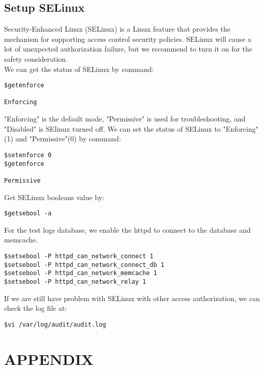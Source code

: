 \subsection{Setup SELinux}
Security-Enhanced Linux (SELinux) is a Linux feature that provides the mechanism for supporting access control security policies.
SELinux will cause a lot of unexpected authorization failure, but we recommend to turn it on for the safety consideration.\\ 
We can get the status of SELinux by command:
\begin{lstlisting}
$getenforce

Enforcing
\end{lstlisting}
"Enforcing" is the default mode, "Permissive" is used for troubleshooting, and "Disabled" is SElinux turned off.
We can set the status of SELinux to "Enforcing"(1) and "Permissive"(0) by command:
\begin{lstlisting}
$setenforce 0
$getenforce

Permissive
\end{lstlisting}
Get SELinux booleans value by:
\begin{lstlisting}
$getsebool -a
\end{lstlisting}
For the test logs database, we enable the httpd to connect to the database and memcache.
\begin{lstlisting}
$setsebool -P httpd_can_network_connect 1
$setsebool -P httpd_can_network_connect_db 1
$setsebool -P httpd_can_network_memcache 1
$setsebool -P httpd_can_network_relay 1
\end{lstlisting}
If we are still have problem with SELinux with other access authorization, we can check the log file at:
\begin{lstlisting}
$vi /var/log/audit/audit.log
\end{lstlisting}

\section{APPENDIX}



